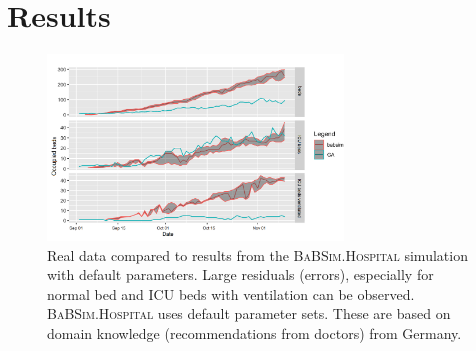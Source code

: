 \documentclass[conference]{IEEEtran}
\newcommand{\babsimhospital}{\textsc{BaBSim.Hospital}\xspace}
\begin{document}
\section{Results}\label{sec:results}
\begin{figure}
  \centering
   \includegraphics[width=0.7\textwidth]{default.png}
  \caption{Real data compared to results from the \babsimhospital simulation with default parameters. Large residuals (errors), especially for normal bed and ICU beds with ventilation can be observed.
   \babsimhospital uses default parameter sets. These are based on domain knowledge (recommendations from doctors) from Germany. }
\label{fig:default}
\end{figure}

\end{document}
